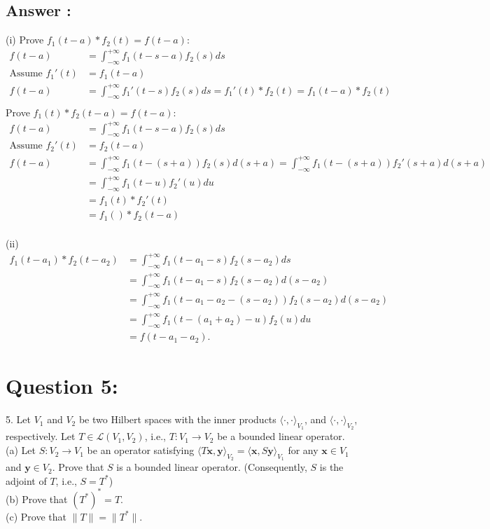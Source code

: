 \documentclass[a4paper,12pt]{article}
\begin{document}
\subsection*{Answer :}
(i) 
Prove \(f_1(t - a) * f_2(t) = f(t - a)\):
\begin{align*}
    f(t - a) &= \int_{-\infty}^{+\infty}f_1(t - s - a)f_2(s)ds \\
    \text{Assume }f_1'(t) &= f_1(t - a) \\
    f(t - a) &= \int_{-\infty}^{+\infty}f_1'(t - s)f_2(s)ds = f_1'(t)*f_2(t) = f_1(t - a)*f_2(t) \\
\end{align*}
Prove \(f_1(t) * f_2(t - a) = f(t - a)\):
\begin{align*}
    f(t - a) &= \int_{-\infty}^{+\infty}f_1(t - s - a)f_2(s)ds \\
    \text{Assume }f_2'(t) &= f_2(t - a) \\
    f(t - a) &= \int_{-\infty}^{+\infty}f_1(t - (s+a))f_2(s)d(s + a) = \int_{-\infty}^{+\infty}f_1(t - (s+a))f_2'(s + a)d(s + a) \\
    &= \int_{-\infty}^{+\infty}f_1(t - u)f_2'(u)du \\
    &= f_1(t)*f_2'(t)  \\
    &= f_1()*f_2(t-a) \\
\end{align*}

\vspace{1cm}
\noindent
(ii)
\begin{align*}
    f_1(t-a_1) * f_2(t-a_2) &= \int_{-\infty}^{+\infty}f_1(t-a_1 - s)f_2(s-a_2)ds\\
    &= \int_{-\infty}^{+\infty}f_1(t-a_1 - s)f_2(s-a_2)d(s - a_2) \\
    &= \int_{-\infty}^{+\infty}f_1(t-a_1 - a_2 - (s - a_2))f_2(s-a_2)d(s - a_2) \\
    &= \int_{-\infty}^{+\infty}f_1(t-(a_1 + a_2) - u)f_2(u)du \\
    &=f(t-a_1-a_2).
\end{align*}

\section*{Question 5:}
5. Let \(V_1\) and \(V_2\) be two Hilbert spaces with the inner products \(\langle \cdot, \cdot \rangle_{V_1}\), and \(\langle \cdot, \cdot\rangle_{V_2}\), respectively.
Let \(T \in \mathcal{L}(V_1, V_2)\), i.e., \(T: V_1 \to V_2\) be a bounded linear operator. \\
(a) Let \(S:V_2 \to V_1\) be an operator satisfying \(\langle T\bm{x}, \bm{y}\rangle_{V_2} = \langle \bm{x}, S\bm{y}\rangle_{V_1}\) for any \(\bm{x} \in V_1\) and \(\bm{y} \in V_2\).
Prove that \(S\) is a bounded linear operator. (Consequently, \(S\) is the adjoint of \(T\), i.e., \(S = T^*\)) \\
(b) Prove that \((T^*)^* = T\). \\
(c) Prove that \(\|T\| = \|T^*\|\).
\end{document}
